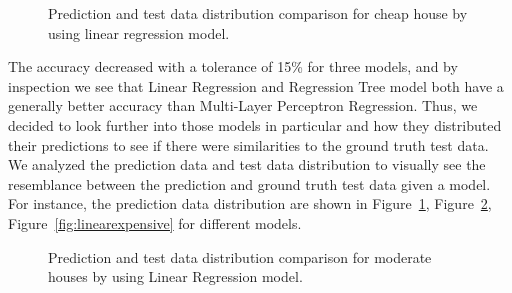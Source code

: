 \documentclass[11pt,a4paper]{article}
\begin{document}
\begin{figure}[h]
    \centering
    \hfill%
    \caption{Prediction and test data distribution comparison for cheap house by using linear regression model.}
    \label{fig:linearcheap}
\end{figure}

\medskip

The accuracy decreased with a tolerance of 15\% for three models, and by inspection we see that Linear Regression and Regression Tree model both have a generally better accuracy than Multi-Layer Perceptron Regression. Thus, we decided to look further into those models in particular and how they distributed their predictions to see if there were similarities to the ground truth test data. We analyzed the prediction data and test data distribution to visually see the resemblance between the prediction and ground truth test data given a model. For instance, the prediction data distribution are shown in Figure~\ref{fig:linearcheap}, Figure~\ref{fig:linearmoderate}, Figure~\ref{fig:linearexpensive} for different models.

\begin{figure}[h]
    \centering
    \hfill%
    \caption{Prediction and test data distribution comparison for moderate houses by using Linear Regression model.}
    \label{fig:linearmoderate}
\end{figure}
\end{document}

